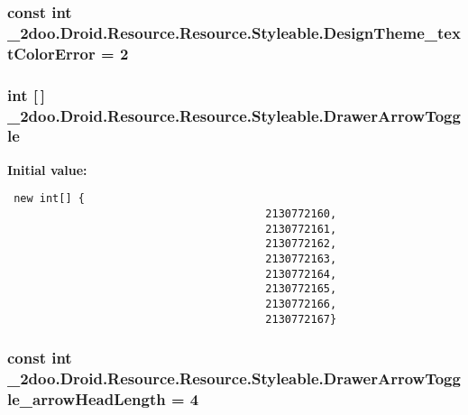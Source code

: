 \hypertarget{class__2doo_1_1_droid_1_1_resource_1_1_styleable_3f59f95a048f1d9f96ef42005b45e63c}{
\subsubsection[{DesignTheme\_\-textColorError}]{\setlength{\rightskip}{0pt plus 5cm}const int \_\-2doo.Droid.Resource.Resource.Styleable.DesignTheme\_\-textColorError = 2}}
\label{class__2doo_1_1_droid_1_1_resource_1_1_styleable_3f59f95a048f1d9f96ef42005b45e63c}


\hypertarget{class__2doo_1_1_droid_1_1_resource_1_1_styleable_ef152e174d19b04aaad8243b3cc0a7db}{
\subsubsection[{DrawerArrowToggle}]{\setlength{\rightskip}{0pt plus 5cm}int \mbox{[}$\,$\mbox{]} \_\-2doo.Droid.Resource.Resource.Styleable.DrawerArrowToggle}}
\label{class__2doo_1_1_droid_1_1_resource_1_1_styleable_ef152e174d19b04aaad8243b3cc0a7db}


\textbf{Initial value:}

\begin{Code}\begin{verbatim} new int[] {
                                        2130772160,
                                        2130772161,
                                        2130772162,
                                        2130772163,
                                        2130772164,
                                        2130772165,
                                        2130772166,
                                        2130772167}
\end{verbatim}
\end{Code}
\hypertarget{class__2doo_1_1_droid_1_1_resource_1_1_styleable_9af99619fe844bf50fd313a24f16194b}{
\subsubsection[{DrawerArrowToggle\_\-arrowHeadLength}]{\setlength{\rightskip}{0pt plus 5cm}const int \_\-2doo.Droid.Resource.Resource.Styleable.DrawerArrowToggle\_\-arrowHeadLength = 4}}
\label{class__2doo_1_1_droid_1_1_resource_1_1_styleable_9af99619fe844bf50fd313a24f16194b}


